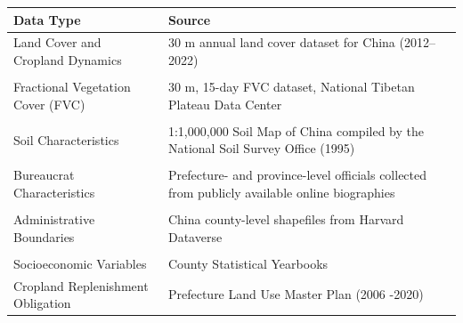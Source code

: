 
\begin{tabular}{p{6cm} p{8cm}}
\toprule
\textbf{Data Type} & \textbf{Source} \\
\midrule
Land Cover and Cropland Dynamics 
& 30 m annual land cover dataset for China (2012--2022)\\
\\
Fractional Vegetation Cover (FVC) 
& 30 m, 15-day FVC dataset, National Tibetan Plateau Data Center \\
\\
Soil Characteristics 
& 1:1,000,000 Soil Map of China compiled by the National Soil Survey Office (1995) \\
\\
Bureaucrat Characteristics 
& Prefecture- and province-level officials collected from publicly available online biographies \\
\\
Administrative Boundaries 
& China county-level shapefiles from Harvard Dataverse \\
\\
Socioeconomic Variables 
& County Statistical Yearbooks \\
Cropland Replenishment Obligation 
& Prefecture Land Use Master Plan (2006 -2020) \\
\bottomrule
\end{tabular}

